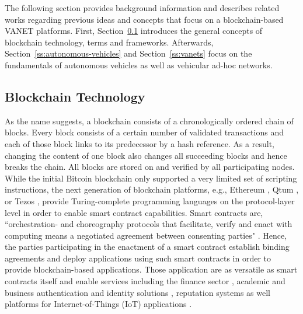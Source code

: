 \documentclass{llncs}
\begin{document}
{		The following section provides background information and describes related works regarding previous ideas and concepts that focus on a blockchain-based VANET platforms. First, Section~\ref{ss:blockchain-intro} introduces the general concepts of blockchain technology, terms and frameworks. Afterwards, Section~\ref{ss:autonomous-vehicles} and Section~\ref{ss:vanets} focus on the fundamentals of autonomous vehicles as well as vehicular ad-hoc networks. %
					
		
		\subsection{Blockchain Technology}
			\label{ss:blockchain-intro}
			
			As the name suggests, a blockchain consists of a chronologically ordered chain of blocks. Every block consists of a certain number of validated transactions and each of those block links to its predecessor by a hash reference. As a result, changing the content of one block also changes all succeeding blocks and hence breaks the chain. All blocks are stored on and verified by all participating nodes. While the initial Bitcoin blockchain only supported a very limited set of scripting instructions, the next generation of blockchain platforms, e.g., Ethereum \cite{wood2014ethereum}, Qtum \cite{qtumWhitepaper}, or Tezos \cite{tezosWhitepaper}, provide Turing-complete programming languages on the protocol-layer level in order to enable smart contract capabilities. Smart contracts are, ``orchestration- and choreography protocols that facilitate, verify and enact with computing means a negotiated agreement between consenting parties" \cite{qtumWhitepaper}. Hence, the parties participating in the enactment of a smart contract establish binding agreements and deploy applications using such smart contracts in order to provide blockchain-based applications. Those application are as versatile as smart contracts itself and enable services including the finance sector \cite{nguyen2016blockchain}\cite{saltWhitepaper}, academic and business authentication and identity solutions \cite{leidingUnchained}\cite{CivicWhitepaper}\cite{AuthcoinLeiding2016MCIS}\cite{mccorry2015authenticated}\cite{SelfkeyWhitepaper}, reputation systems \cite{SemadaWhitepaper} as well platforms for Internet-of-Things (IoT) applications \cite{christidis2016blockchains}\cite{ouaddah2017towards}. 	
			
}
\end{document}
